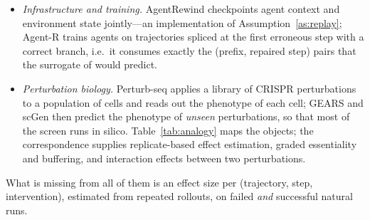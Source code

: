 \documentclass[10pt,a4paper]{article}
\begin{document}
\begin{itemize}[leftmargin=1.1em]
\item \emph{Infrastructure and training.} AgentRewind \cite{zhuang2026agentrewind} checkpoints agent context and environment state jointly---an implementation of Assumption~\ref{as:replay}; Agent-R \cite{yuan2025agentr} trains agents on trajectories spliced at the first erroneous step with a correct branch, i.e.\ it consumes exactly the (prefix, repaired step) pairs that the surrogate of  would predict.
\item \emph{Perturbation biology.} Perturb-seq \cite{dixit2016perturbseq} applies a library of CRISPR perturbations to a population of cells and reads out the phenotype of each cell; GEARS \cite{roohani2024gears} and scGen \cite{lotfollahi2019scgen} then predict the phenotype of \emph{unseen} perturbations, so that most of the screen runs in silico. Table~\ref{tab:analogy} maps the objects; the correspondence supplies replicate-based effect estimation, graded essentiality and buffering, and interaction effects between two perturbations.
\end{itemize}
What is missing from all of them is an effect size per (trajectory, step, intervention), estimated from repeated rollouts, on failed \emph{and} successful natural runs.
\end{document}
